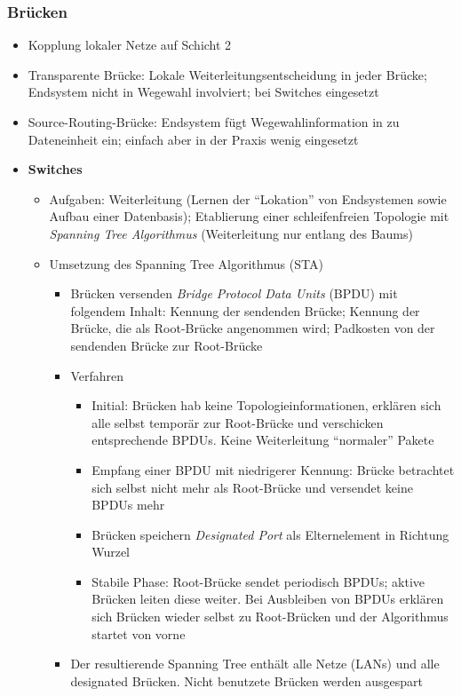 \subsubsection{Brücken}
\begin{itemize}
	\item Kopplung lokaler Netze auf Schicht 2
	\item Transparente Brücke: Lokale Weiterleitungsentscheidung in jeder Brücke; Endsystem nicht in Wegewahl involviert; bei Switches eingesetzt
	\item Source-Routing-Brücke: Endsystem fügt Wegewahlinformation in zu Dateneinheit ein; einfach aber in der Praxis wenig eingesetzt
	\item \textbf{Switches}
	\begin{itemize}
		\item Aufgaben: Weiterleitung (Lernen der "`Lokation"' von Endsystemen sowie Aufbau einer Datenbasis); Etablierung einer schleifenfreien Topologie mit \textit{Spanning Tree Algorithmus} (Weiterleitung nur entlang des Baums)
		\item Umsetzung des Spanning Tree Algorithmus (STA)
		\begin{itemize}
			\item Brücken versenden \textit{Bridge Protocol Data Units} (BPDU) mit folgendem Inhalt: Kennung der sendenden Brücke; Kennung der Brücke, die als Root-Brücke angenommen wird; Padkosten von der sendenden Brücke zur Root-Brücke
			\item Verfahren
			\begin{itemize}
				\item Initial: Brücken hab keine Topologieinformationen, erklären sich alle selbst temporär zur Root-Brücke und verschicken entsprechende BPDUs. Keine Weiterleitung "`normaler"' Pakete
				\item Empfang einer BPDU mit niedrigerer Kennung: Brücke betrachtet sich selbst nicht mehr als Root-Brücke und versendet keine BPDUs mehr
				\item Brücken speichern \textit{Designated Port} als Elternelement in Richtung Wurzel
				\item Stabile Phase: Root-Brücke sendet periodisch BPDUs; aktive Brücken leiten diese weiter. Bei Ausbleiben von BPDUs erklären sich Brücken wieder selbst zu Root-Brücken und der Algorithmus startet von vorne
			\end{itemize}
			\item Der resultierende Spanning Tree enthält alle Netze (LANs) und alle designated Brücken. Nicht benutzete Brücken werden ausgespart

\end{itemize}
\end{itemize}
\end{itemize}
